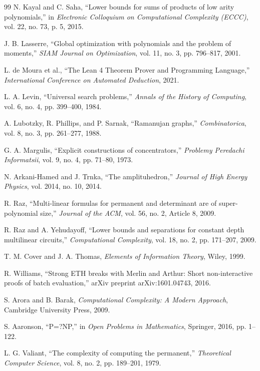 \documentclass[12pt]{article}
\theoremstyle{definition}
\theoremstyle{definition}
\theoremstyle{remark}
\theoremstyle{remark}
\begin{document}
\begin{thebibliography}{99}
N. Kayal and C. Saha, ``Lower bounds for sums of products of low arity polynomials,'' in \emph{Electronic Colloquium on Computational Complexity (ECCC)}, vol. 22, no. 73, p. 5, 2015.

J. B. Lasserre, ``Global optimization with polynomials and the problem of moments,'' \emph{SIAM Journal on Optimization}, vol. 11, no. 3, pp. 796--817, 2001.

L. de Moura et al., ``The Lean 4 Theorem Prover and Programming Language,'' \emph{International Conference on Automated Deduction}, 2021.

L. A. Levin, ``Universal search problems,'' \emph{Annals of the History of Computing}, vol. 6, no. 4, pp. 399--400, 1984.

A. Lubotzky, R. Phillips, and P. Sarnak, ``Ramanujan graphs,'' \emph{Combinatorica}, vol. 8, no. 3, pp. 261--277, 1988.

G. A. Margulis, ``Explicit constructions of concentrators,'' \emph{Problemy Peredachi Informatsii}, vol. 9, no. 4, pp. 71--80, 1973.

N. Arkani-Hamed and J. Trnka, ``The amplituhedron,'' \emph{Journal of High Energy Physics}, vol. 2014, no. 10, 2014.

R. Raz, ``Multi-linear formulas for permanent and determinant are of super-polynomial size,'' \emph{Journal of the ACM}, vol. 56, no. 2, Article 8, 2009.

R. Raz and A. Yehudayoff, ``Lower bounds and separations for constant depth multilinear circuits,'' \emph{Computational Complexity}, vol. 18, no. 2, pp. 171--207, 2009.

T. M. Cover and J. A. Thomas, \emph{Elements of Information Theory}, Wiley, 1999.

R. Williams, ``Strong ETH breaks with Merlin and Arthur: Short non-interactive proofs of batch evaluation,'' arXiv preprint arXiv:1601.04743, 2016.

S. Arora and B. Barak, \emph{Computational Complexity: A Modern Approach}, Cambridge University Press, 2009.

S. Aaronson, ``P=?NP,'' in \emph{Open Problems in Mathematics}, Springer, 2016, pp. 1--122.

L. G. Valiant, ``The complexity of computing the permanent,'' \emph{Theoretical Computer Science}, vol. 8, no. 2, pp. 189--201, 1979.


\end{thebibliography}
\end{document}
